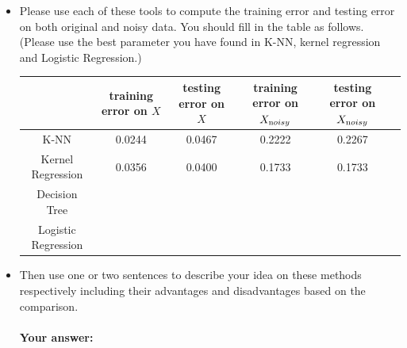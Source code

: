 \documentclass[english]{article}
\begin{document}
\begin{itemize}

\item Please use each of these tools to compute the training error and testing error on both original and noisy data. You should fill in the table as follows. (Please use the best parameter you have found in K-NN, kernel regression and Logistic Regression.)


\begin{table}[!htb]
\centering
\begin{tabular}{|c|c|c|c|c|c|} \hline
&training error on $X$& testing error on $X$&training error on $X_{\text noisy}$&testing error on $X_{\text noisy}$\\ \hline
K-NN & 0.0244 & 0.0467 & 0.2222 & 0.2267 \\ \hline
Kernel Regression & 0.0356 & 0.0400 & 0.1733 & 0.1733 \\ \hline
Decision Tree & & & & \\ \hline
Logistic Regression & & & & \\ \hline
\end{tabular}
\end{table} 

\item Then use one or two sentences to describe your idea on these methods respectively including their advantages and disadvantages based on the comparison. 

\paragraph{Your answer:}
 ~\\
 
\end{itemize}
\end{document}
